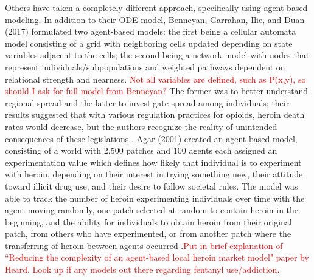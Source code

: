 \documentclass[12pt]{article}
\begin{document}
Others have taken a completely different approach, specifically using agent-based modeling. In addition to their ODE model, Benneyan, Garrahan, Ilie, and Duan (2017) formulated two agent-based models: the first being a cellular automata model consisting of a grid with neighboring cells updated depending on state variables adjacent to the cells; the second being a network model with nodes that represent individuals/subpopulations and weighted pathways dependent on relational strength and nearness. \textcolor{red}{Not all variables are defined, such as P(x,y), so should I ask for full model from Benneyan?} The former was to better understand regional spread and the latter to investigate spread among individuals; their results suggested that with various regulation practices for opioids, heroin death rates would decrease, but the authors recognize the reality of unintended consequences of these legislations \cite{Benneyan}. Agar (2001) created an agent-based model, consisting of a world with 2,500 patches and 100 agents each assigned an experimentation value which defines how likely that individual is to experiment with heroin, depending on their interest in trying something new, their attitude toward illicit drug use, and their desire to follow societal rules. The model was able to track the number of heroin experimenting individuals over time with the agent moving randomly, one patch selected at random to contain heroin in the beginning, and the ability for individuals to obtain heroin from their original patch, from others who have experimented, or from another patch where the transferring of heroin between agents occurred \cite{Agar}.\textcolor{red}{Put in brief explanation of ``Reducing the complexity of an agent-based local heroin market model" paper by Heard. Look up if any models out there regarding fentanyl use/addiction.} \\
\end{document}

